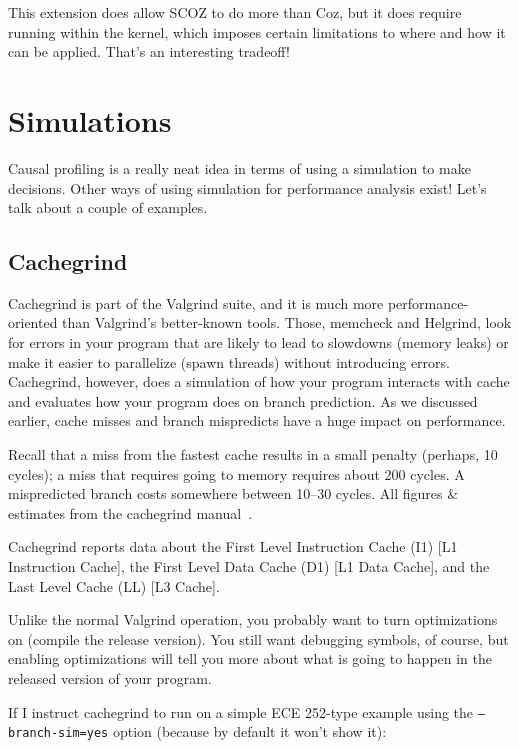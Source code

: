 This extension does allow SCOZ to do more than Coz, but it does require running within the kernel, which imposes certain limitations to where and how it can be applied. That's an interesting tradeoff!

\section*{Simulations}
Causal profiling is a really neat idea in terms of using a simulation to make decisions. Other ways of using simulation for performance analysis exist! Let's talk about a couple of examples.

\subsection*{Cachegrind}

Cachegrind is part of the Valgrind suite, and it is much more performance-oriented than Valgrind's better-known tools. Those, memcheck and Helgrind, look for errors in your program that are likely to lead to slowdowns (memory leaks) or make it easier to parallelize (spawn threads) without introducing errors. Cachegrind, however, does a simulation of how your program interacts with cache and evaluates how your program does on branch prediction. As we discussed earlier, cache misses and branch mispredicts have a huge impact on performance.

Recall that a miss from the fastest cache results in a small penalty (perhaps, 10 cycles); a miss that requires going to memory requires about 200 cycles. A mispredicted branch costs somewhere between 10--30 cycles. All figures \& estimates from the cachegrind manual~\cite{cachegrind}.

Cachegrind reports data about the First Level Instruction Cache (I1) [L1 Instruction Cache], the First Level Data Cache (D1) [L1 Data Cache], and the Last Level Cache (LL) [L3 Cache].

Unlike the normal Valgrind operation, you probably want to turn optimizations on (compile the release version). You still want debugging symbols, of course, but enabling optimizations will tell you more about what is going to happen in the released version of your program.

If I instruct cachegrind to run on a simple ECE 252-type example using the \texttt{--branch-sim=yes} option (because by default it won't show it):

